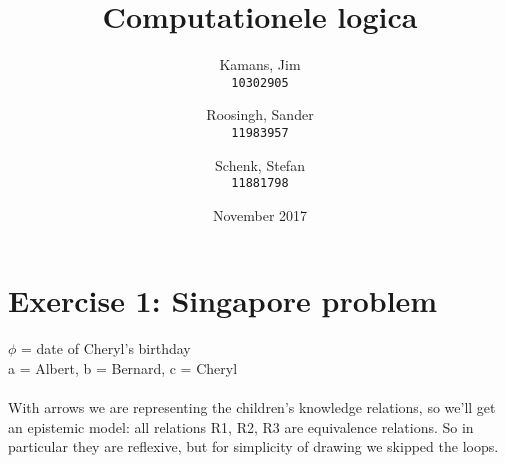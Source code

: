\documentclass[leqno]{article}
\title{Computationele logica}
\author{
    Kamans, Jim\\
    \texttt{10302905}
    \and
    Roosingh, Sander\\
    \texttt{11983957}
    \and
    Schenk, Stefan\\
    \texttt{11881798}
}
\date{November 2017}
\begin{document}
\maketitle

\section{Exercise 1: Singapore problem}

$\phi$ = date of Cheryl's birthday \\
a = Albert, b = Bernard, c = Cheryl \\
\\
With arrows we are representing the children’s knowledge relations, so we’ll get an epistemic model: all relations R1, R2, R3 are equivalence relations. So in particular they are reflexive, but for simplicity of drawing we skipped the loops.
\\
\end{document}
